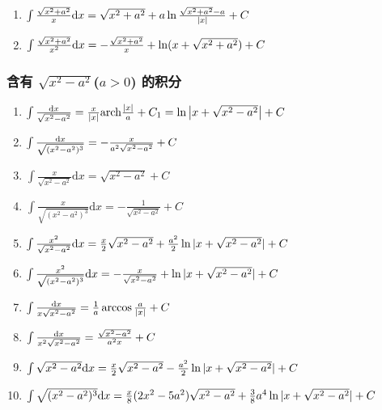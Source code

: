 \begin{small}
\begin{enumerate}
\item $ \int \frac{\sqrt{x^2+a^2}}{x} \mathrm{d} x = \sqrt{x^2+a^2} + a \ln \frac{\sqrt{x^2+a^2}-a}{|x|} + C $

\item $ \int \frac{\sqrt{x^2+a^2}}{x^2} \mathrm{d} x = -\frac{\sqrt{x^2+a^2}}{x} + \ln(x + \sqrt{x^2+a^2}) + C $

\end{enumerate}

\subsubsection{含有 $\sqrt{x^2-a^2}$($a>0$) 的积分}

\begin{enumerate}

\item $ \int \frac{\mathrm{d} x}{\sqrt{x^2-a^2}} = \frac{x}{|x|} \mathrm{arch} \frac{|x|}{a} + C_1 = \ln\left|x+\sqrt{x^2-a^2}\right| + C $

\item $ \int \frac{\mathrm{d} x}{\sqrt{(x^2-a^2)^3}} = -\frac{x}{a^2\sqrt{x^2-a^2}} + C$

\item $ \int \frac{x}{\sqrt{x^2-a^2}} \mathrm{d}x = \sqrt{x^2-a^2} + C $

\item $ \int \frac{x}{\sqrt{(x^2-a^2)^3}} \mathrm{d}x = -\frac{1}{\sqrt{x^2-a^2}} + C $

\item $ \int \frac{x^2}{\sqrt{x^2-a^2}} \mathrm{d} x = \frac{x}{2}\sqrt{x^2-a^2} + \frac{a^2}{2}\ln|x+\sqrt{x^2-a^2}| + C $

\item $ \int \frac{x^2}{\sqrt{(x^2-a^2)^3}} \mathrm{d} x = -\frac{x}{\sqrt{x^2-a^2}} + \ln|x+\sqrt{x^2-a^2}| + C $

\item $ \int \frac{\mathrm{d} x}{x\sqrt{x^2-a^2}} = \frac{1}{a} \arccos \frac{a}{|x|} + C $

\item $ \int \frac{\mathrm{d} x}{x^2\sqrt{x^2-a^2}} = \frac{\sqrt{x^2-a^2}}{a^2x} + C $

\item $ \int \sqrt{x^2-a^2} \mathrm{d} x = \frac{x}{2}\sqrt{x^2-a^2} - \frac{a^2}{2}\ln|x + \sqrt{x^2-a^2}| + C $

\item $ \int \sqrt{(x^2-a^2)^3} \mathrm{d} x = \frac{x}{8}(2x^2-5a^2)\sqrt{x^2-a^2} + \frac{3}{8}a^4\ln|x + \sqrt{x^2-a^2}| + C $


\end{enumerate}
\end{small}
